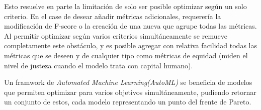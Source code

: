 Esto resuelve en parte la limitaci\'on de solo ser posible optimizar seg\'un un solo criterio. En el case de desear a\~nadir m\'etricas adicionales, requerer\'ia la modificaci\'on de F-score o la creaci\'on de una nueva que agrupe todas las m\'etricas. Al permitir optimizar seg\'un varios criterios simult\'aneamente se remueve completamente este obst\'aculo, y es posible agregar con relativa facilidad todas las m\'etricas que se deseen y de cualquier tipo como m\'etricas de equidad (miden el nivel de justeza cuando el modelo trata con capital humano).

Un framwork de \textit{Automated Machine Learning(AutoML)} se beneficia de modelos que permiten optimizar para varios objetivos simult\'aneamente, pudiendo retornar un conjunto de estos, cada modelo representando un punto del frente de Pareto.








